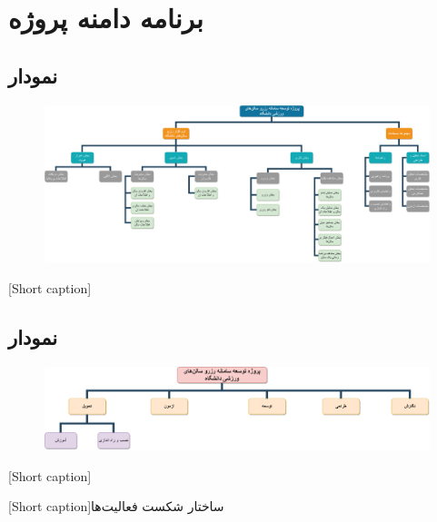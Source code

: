 \section{
برنامه دامنه پروژه
}

\subsection{
نمودار
}

\begin{center}
  \begin{figure} [h!]
    { \includegraphics[page=1, width=\textwidth]{appandecies/PC-WBS.pdf}}
  \end{figure}
  [Short caption]{}
\end{center}

\subsection{
نمودار
}

\begin{center}
  \begin{figure} [h!]
    { \includegraphics[page=1, width=\textwidth]{appandecies/F-WBS.pdf}}
  \end{figure}
  [Short caption]{}
\end{center}

\pagebreak

	
	[Short caption]{ساختار شکست فعالیت‌ها}

